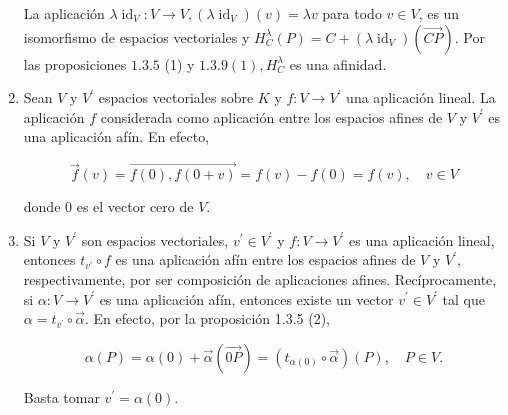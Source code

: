 \documentclass[12pt, a4paper, ones, notitlepage, openany,titlepage]{article}
\begin{document}
\begin{enumerate}
La aplicación $\lambda \operatorname{id}_{V}: V \rightarrow V,\left(\lambda \operatorname{id}_{V}\right)(v)=\lambda v$ para todo $v \in V$, es un isomorfismo de espacios vectoriales y $H_{C}^{\lambda}(P)=C+\left(\lambda \operatorname{id}_{V}\right)(\overrightarrow{C P})$. Por las proposiciones $1.3 .5$ (1) y $1.3 .9(1), H_{C}^{\lambda}$ es una afinidad.

\item Sean $V$ y $V^{\prime}$ espacios vectoriales sobre $K$ y $f: V \rightarrow V^{\prime}$ una aplicación lineal. La aplicación $f$ considerada como aplicación entre los espacios afines de $V$ y $V^{\prime}$ es una aplicación afín. En efecto,

$$
\vec{f}(v)=\overrightarrow{f(0), f(0+v)}=f(v)-f(0)=f(v), \quad v \in V
$$

donde 0 es el vector cero de $V$.

\item Si $V$ y $V^{\prime}$ son espacios vectoriales, $v^{\prime} \in V^{\prime}$ y $f: V \rightarrow V^{\prime}$ es una aplicación lineal, entonces $t_{v^{\prime}} \circ f$ es una aplicación afín entre los espacios afines de $V$ y $V^{\prime}$, respectivamente, por ser composición de aplicaciones afines. Recíprocamente, si $\alpha: V \rightarrow V^{\prime}$ es una aplicación afín, entonces existe un vector $v^{\prime} \in V^{\prime}$ tal que $\alpha=t_{v^{\prime}} \circ \vec{\alpha}$. En efecto, por la proposición 1.3.5 (2),

$$
\alpha(P)=\alpha(0)+\vec{\alpha}(\overrightarrow{0 P})=\left(t_{\alpha(0)} \circ \vec{\alpha}\right)(P), \quad P \in V .
$$

Basta tomar $v^{\prime}=\alpha(0)$.

\end{enumerate}
\end{document}

